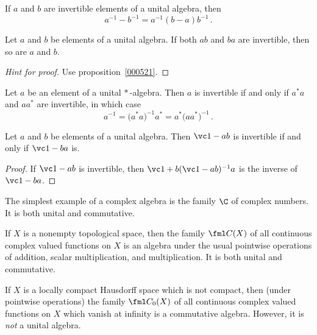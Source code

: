 \begin{prop}\label{000524} If $a$ and $b$ are invertible elements of a unital algebra,
then
  \[ a^{-1} - b^{-1} = a^{-1}(b - a)b^{-1}\,. \]
\end{prop}

\begin{prop} Let $a$ and $b$ be elements of a unital algebra.  If both $ab$ and
$ba$ are invertible, then so are $a$ and $b$.
\end{prop}

\begin{proof}[\emph{Hint for proof}] Use proposition~\ref{000521}. \ns \end{proof}

\begin{cor} Let $a$ be an element of a unital $*\,$-algebra.  Then $a$ is invertible if and only if $a^*a$ and $aa^*$
are invertible, in which case
   \[ a^{-1} = \bigl(a^*a\bigr)^{-1}a^* = a^*\big(aa^*\bigr)^{-1}\,. \]
\end{cor}

\begin{prop}\label{000526} Let $a$ and $b$ be elements of a unital algebra.  Then
$\vc 1 - ab$ is invertible if and only if $\vc 1 - ba$ is.
\end{prop}

\begin{proof} If $\vc 1 - ab$ is invertible, then $\vc 1 + b(\vc 1 - ab)^{-1}a$ is the
inverse of $\vc 1 - ba$.
\end{proof}

\begin{exam} The simplest example of a complex algebra is the family $\C$ of complex
numbers.  It is both unital and commutative.
\end{exam}

\begin{exam}\label{000532} If $X$ is a nonempty topological space, then the family $\fml C(X)$
of all continuous complex valued functions on $X$ is an
algebra under the usual pointwise operations of addition, scalar multiplication, and
multiplication. It is both unital and commutative.
\end{exam}

\begin{exam} If $X$ is a locally compact Hausdorff space which is not compact, then (under
pointwise operations) the family $\fml C_0(X)$ of all continuous complex valued functions
on $X$ which vanish at infinity is a commutative algebra.
However, it is \emph{not} a
unital algebra.
\end{exam}

